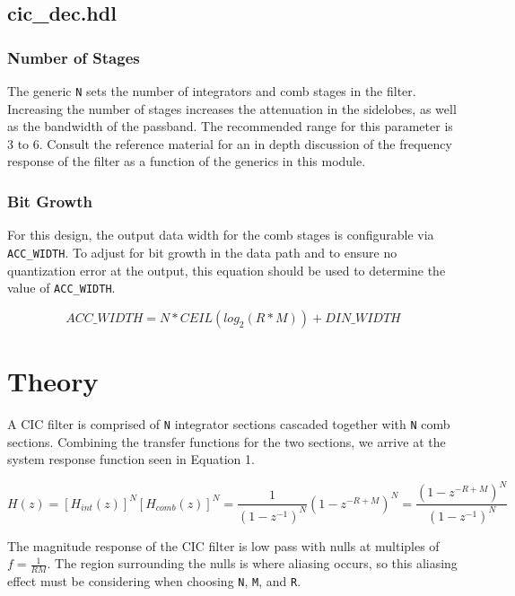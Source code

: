 \documentclass{article}
\def\comp{cic\_dec}
\begin{document}
\subsection*{\comp.hdl}
\subsubsection*{Number of Stages}
\begin{flushleft}
	The generic \verb+N+ sets the number of integrators and comb stages in the filter.	Increasing the number of stages increases the attenuation in the sidelobes, as well as the bandwidth of the passband. The recommended range for this parameter is 3 to 6. Consult the reference material for an in depth discussion of the frequency response of the filter as a function of the generics in this module.
\end{flushleft}
\subsubsection*{Bit Growth}
\begin{flushleft}
	For this design, the output data width for the comb stages is configurable via	\verb+ACC_WIDTH+. To adjust for bit growth in the data path and to ensure no quantization error at the output, this equation should be used to determine the value of \verb+ACC_WIDTH+.

	\begin{equation} \label{eq:acc_width}
		ACC\_WIDTH = N*CEIL(log_2(R*M))+DIN\_WIDTH
	\end{equation}
\end{flushleft}

\section*{Theory}
\begin{flushleft}
	A CIC filter is comprised of \verb+N+ integrator sections cascaded together with \verb+N+ comb sections. Combining the transfer functions for the two sections, we arrive at the system response function seen in Equation 1.

	\begin{equation} \label{eq:response_function}
		H(z) = [H_{int}(z)]^N[H_{comb}(z)]^N = \frac{1}{(1-z^{-1})^N}(1-z^{-R+M})^N = 	\frac{(1 - z^{-R+M})^N}{(1-z^{-1})^N}
	\end{equation}

	The magnitude response of the CIC filter is low pass with nulls at multiples of $f=\frac{1}{RM}$. The region surrounding the nulls is where aliasing occurs, so 	this aliasing effect must be considering when choosing \verb+N+, \verb+M+, and \verb+R+.
\end{flushleft}
\end{document}
